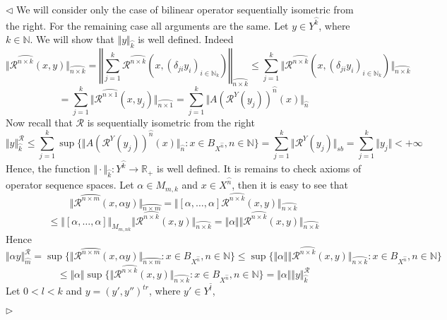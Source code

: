 \documentclass[12pt]{article}
\newenvironment{proof}{\par $\triangleleft$}{$\triangleright$}
\begin{document}
\begin{proof}
We will consider only the case of bilinear operator sequentially isometric 
from the right. For the remaining case all arguments are the same. 
Let $y\in Y^{\wideparen{k}}$, where $k\in\mathbb{N}$. We will show that 
$\Vert y\Vert_{\wideparen{k}}$ is well defined. Indeed
$$
\Vert\mathcal{R}^{\wideparen{n\times k}}(x,y)\Vert_{\wideparen{n\times k}}
=\left\Vert\sum\limits_{j=1}^k\mathcal{R}^{\wideparen{n\times
k}}(x,{(\delta_{ji}y_i)}_{i\in\mathbb{N}_k})\right\Vert_{\wideparen{n\times k}}
\leq\sum\limits_{j=1}^k\Vert\mathcal{R}^{\wideparen{n\times
k}}(x,{(\delta_{ji}y_i)}_{i\in\mathbb{N}_k})\Vert_{\wideparen{n\times k}}
$$
$$
=\sum\limits_{j=1}^k\Vert
    \mathcal{R}^{\wideparen{n\times 1}}(x,y_j)
\Vert_{\wideparen{n\times 1}}
=\sum\limits_{j=1}^k\Vert 
    {A(\mathcal{R}^Y(y_j))}^{\wideparen{n}}(x)
\Vert_{\wideparen{n}}
$$
Now recall that $\mathcal{R}$ is sequentially isometric from the right
$$
\Vert y\Vert_{\wideparen{k}}^{\mathcal{R}} 
\leq\sum\limits_{j=1}^k\sup \{
    \Vert
        {A(\mathcal{R}^Y(y_j))}^{\wideparen{n}}(x)
    \Vert_{\wideparen{n}}
    :x\in B_{X^{\wideparen{n}}}, n\in\mathbb{N} 
 \} 
=\sum\limits_{j=1}^k
\Vert\mathcal{R}^Y(y_j)\Vert_{sb} =\sum\limits_{j=1}^k \Vert y_j\Vert<+\infty
$$
Hence, the function 
$\Vert\cdot\Vert_{\wideparen{k}}:Y^{\wideparen{k}}\to\mathbb{R}_+$ is well 
defined. It is remains to check axioms of operator sequence spaces. 
Let $\alpha\in M_{m,k}$ and $x\in X^{\wideparen{n}}$, 
then it is easy to see that
$$
\Vert\mathcal{R}^{\wideparen{n\times m}}(x,\alpha y)\Vert_{\wideparen{n\times
m}} =\Vert[\alpha,\ldots,\alpha]\mathcal{R}^{\wideparen{n\times
k}}(x,y)\Vert_{\wideparen{n\times k}}
$$
$$
\leq
\Vert
    [\alpha,\ldots,\alpha]
\Vert_{M_{m,nk}}
\Vert
    \mathcal{R}^{\wideparen{n\times k}}(x,y)
\Vert_{\wideparen{n\times k}}
=\Vert
    \alpha\Vert\Vert\mathcal{R}^{\wideparen{n\times k}}(x,y)
\Vert_{\wideparen{n\times k}}
$$
Hence
$$
\Vert\alpha y\Vert_{\wideparen{m}}^{\mathcal{R}}
=\sup \{
    \Vert
        \mathcal{R}^{\wideparen{n\times m}}(x,\alpha y)
    \Vert_{\wideparen{n\times m}}
    :x\in B_{X^{\wideparen{n}}},n\in\mathbb{N} 
 \}
\leq\sup \{
    \Vert
        \alpha
    \Vert
    \Vert
        \mathcal{R}^{\wideparen{n\times k}}(x,y)
    \Vert_{\wideparen{n\times k}}
    :x\in B_{X^{\wideparen{n}}},n\in\mathbb{N} 
 \}
$$
$$
\leq\Vert\alpha\Vert\sup \{\Vert\mathcal{R}^{\wideparen{n\times
k}}(x,y)\Vert_{\wideparen{n\times k}}:x\in
B_{X^{\wideparen{n}}},n\in\mathbb{N} \} =\Vert\alpha\Vert\Vert
y\Vert_{\wideparen{k}}^{\mathcal{R}}
$$
Let $0<l<k$ and $y={(y', y'')}^{tr}$, where $y'\in Y^{\wideparen{l}}$, 

\end{proof}
\end{document}
